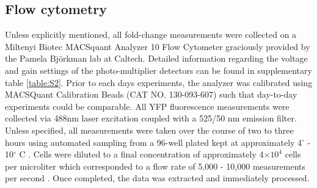 
\subsection*{Flow cytometry}
Unless explicitly mentioned, all fold-change measurements were collected on a
Miltenyi Biotec MACSquant Analyzer 10 Flow Cytometer graciously provided by the
Pamela Bj\"{o}rkman lab at Caltech. Detailed information regarding the voltage
and gain  settings of the photo-multiplier detectors can be found in
supplementary table \ref{table:S2}. Prior to each days experiments, the
analyzer was calibrated using MACSQuant Calibration Beads (CAT NO. 130-093-607)
such that day-to-day experiments could be comparable. All YFP fluorescence
measurements were collected via 488nm laser excitation  coupled with a 525/50
nm emission filter. Unless specified, all measurements were  taken over the
course of two to three hours using automated sampling from a 96-well plated
kept at approximately 4$^\circ$ - 10$^\circ$ C . Cells were diluted to a final concentration of
approximately 4$\times 10^{4}$ cells per microliter which corresponded to a
flow rate of 5,000 - 10,000 measurements per second . Once completed, the data
was extracted and immediately  processed. 

